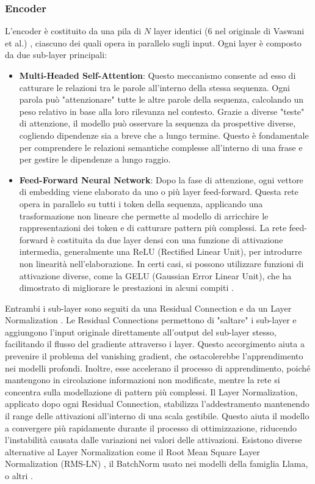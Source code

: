 \subsubsection{Encoder}
L'encoder è costituito da una pila di \(N\) layer identici (6 nel  originale di Vaswani et al.) \cite{vaswani2023attentionneed}, ciascuno dei quali opera in parallelo sugli input. Ogni layer è composto da due sub-layer principali:
\begin{itemize}
	\item \textbf{Multi-Headed Self-Attention}: Questo meccanismo consente ad esso di catturare le relazioni tra le parole all'interno della stessa sequenza. Ogni parola può "attenzionare" tutte le altre parole della sequenza, calcolando un peso relativo in base alla loro rilevanza nel contesto. Grazie a diverse "teste" di attenzione, il modello può osservare la sequenza da prospettive diverse, cogliendo dipendenze sia a breve che a lungo termine. Questo è fondamentale per comprendere le relazioni semantiche complesse all'interno di una frase e per gestire le dipendenze a lungo raggio.
	\item \textbf{Feed-Forward Neural Network}: Dopo la fase di attenzione, ogni vettore di embedding viene elaborato da uno o più layer feed-forward. Questa rete opera in parallelo su tutti i token della sequenza, applicando una trasformazione non lineare che permette al modello di arricchire le rappresentazioni dei token e di catturare pattern più complessi. La rete feed-forward è costituita da due layer densi con una funzione di attivazione intermedia, generalmente una ReLU (Rectified Linear Unit), per introdurre non linearità nell'elaborazione. In certi casi, si possono utilizzare funzioni di attivazione diverse, come la GELU (Gaussian Error Linear Unit), che ha dimostrato di migliorare le prestazioni in alcuni compiti \cite{hendrycks2023gaussianerrorlinearunits}.
\end{itemize}
Entrambi i sub-layer sono seguiti da una Residual Connection e da un Layer Normalization \cite{ba2016layernormalization}. Le Residual Connections permettono di "saltare" i sub-layer e aggiungono l'input originale direttamente all'output del sub-layer stesso, facilitando il flusso del gradiente attraverso i layer. Questo accorgimento aiuta a prevenire il problema del vanishing gradient, che ostacolerebbe l'apprendimento nei modelli profondi. Inoltre, esse accelerano il processo di apprendimento, poiché mantengono in circolazione informazioni non modificate, mentre la rete si concentra sulla modellazione di pattern più complessi.
Il Layer Normalization, applicato dopo ogni Residual Connection, stabilizza l'addestramento mantenendo il range delle attivazioni all'interno di una scala gestibile. Questo aiuta il modello a convergere più rapidamente durante il processo di ottimizzazione, riducendo l'instabilità causata dalle variazioni nei valori delle attivazioni. Esistono diverse alternative al Layer Normalization come il Root Mean Square Layer Normalization (RMS-LN) \cite{zhang2019rootmeansquarelayer}, il BatchNorm usato nei modelli della famiglia Llama, o altri \cite{https://doi.org/10.5281/zenodo.3525484}.

